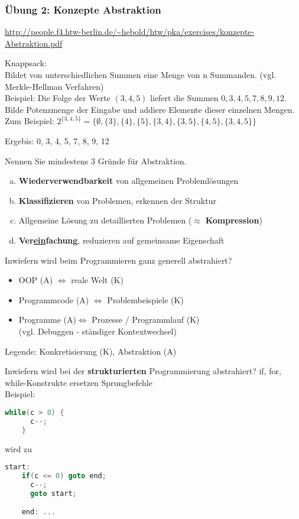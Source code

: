 \begin{card}
	\frametitle{Übung 2: Konzepte Abstraktion}
	\url{http://people.f4.htw-berlin.de/~hebold/htw/pka/exercises/konzepte-Abstraktion.pdf}
\end{card}

\begin{card}
	Knappsack:\\
	Bildet von unterschiedlichen Summen eine Menge von n Summanden. (vgl. Merkle-Hellman Verfahren)\\
	Beispiel: Die Folge der Werte $( 3, 4, 5 )$ liefert die Summen $0, 3, 4, 5, 7, 8, 9, 12$.
	\hr
	Bilde Potenzmenge der Eingabe und addiere Elemente dieser einzelnen Mengen.\\
	Zum Beispiel: $2^{\{ 3, 4, 5 \}} = \{\emptyset, \{3\}, \{4\}, \{5\}, \{3,4\}, \{3,5\}, \{4,5\}, \{3,4,5\} \}$

	Ergebis: 0, 3, 4, 5, 7, 8, 9, 12
\end{card}

\begin{card}
	Nennen Sie mindestens 3 Gründe für Abstraktion.
	\hr
	\begin{enumerate}[a)]
	\item \textbf{Wiederverwendbarkeit} von allgemeinen Problemlösungen
	\item \textbf{Klassifizieren} von Problemen, erkennen der Struktur
	\item Allgemeine Lösung zu detaillierten Problemen ($\approx$ \textbf{Kompression})
	\item \textbf{Ver\uline{ein}fachung}, reduzieren auf gemeinsame Eigenschaft
	\end{enumerate}
\end{card}

\begin{card}
	Inwiefern wird beim Programmieren ganz generell abstrahiert?
	\hr
	\begin{itemize}
	\item OOP (A) $\Leftrightarrow$ reale Welt (K)
	\item Programmcode (A) $\Leftrightarrow$ Problembeispiele (K)
	\item Programme (A)$\Leftrightarrow$ Prozesse / Programmlauf (K)\\(vgl. Debuggen - ständiger Kontextwechsel)
	\end{itemize}
	Legende: Konkretisierung (K), Abstraktion (A)
\end{card}

\begin{card}
	Inwiefern wird bei der \textbf{strukturierten} Programmierung abstrahiert?
	\hr
	if, for, while-Konstrukte ersetzen Sprungbefehle\\
	Beispiel:
	\begin{lstlisting}[language=C]
	while(c > 0) {
	  c--;
	}
	\end{lstlisting}
	wird zu
	\begin{lstlisting}[language=C]
	start:
	if(c <= 0) goto end;
	  c--;
	  goto start;

	end: ...
	\end{lstlisting}
\end{card}


